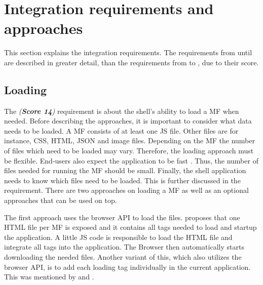 
\section{Integration requirements and approaches}\label{cha:requirement_detail_integration}

This section explains the integration requirements.
The requirements from \textit{} until \textit{} are described in greater detail, than the requirements from \textit{} to \textit{}, due to their score.





\subsection{Loading}\label{cha:requirement_detail_integration_loading}

The \textit{ (\textbf{Score 14})} requirement is about the shell's ability to load a \ac{MF} when needed.
Before describing the approaches, it is important to consider what data needs to be loaded.
A \ac{MF} consists of at least one \ac{JS} file.
Other files are for instance, \ac{CSS}, \ac{HTML}, \ac{JSON} and image files.
Depending on the \ac{MF} the number of files which need to be loaded may vary.
Therefore, the loading approach must be flexible.
End-users also expect the application to be fast \cite[p.~244p]{Zhou.2008}.
Thus, the number of files needed for running the \ac{MF} should be small.
Finally, the shell application needs to know which files need to be loaded.
This is further discussed in the \textit{} requirement.
There are two approaches on loading a \ac{MF} as well as an optional approaches that can be used on top.

The first approach uses the browser \ac{API} to load the files.
\textciteMezzalira{} proposes that one \ac{HTML} file per \ac{MF} is exposed and it contains all tags needed to load and startup the application.
A little \ac{JS} code is responsible to load the \ac{HTML} file and integrate all tags into the application.
The Browser then automatically starts downloading the needed files.
Another variant of this, which also utilizes the browser \ac{API}, is to add each loading tag individually in the current application.
This was mentioned by \textcite{Dornenburg.2019} and \textcite{Laug.2018}.

